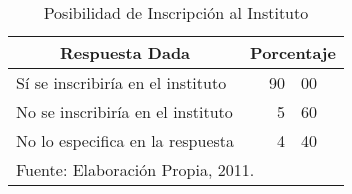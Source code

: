 \begin{table}[h!]
    \caption{Posibilidad de Inscripción al Instituto}
    \label{tbl:Encuesta:Aceptacion}
    \centering
    \begin{tabular}{l|r@{.}l@{\%}}
	    \multicolumn{1}{c|}{Respuesta Dada} &
	    	\multicolumn{2}{c}{Porcentaje} \\
	    \hline
	    \hline
	    Sí se inscribiría en el instituto & 90 & 00 \\
	    No se inscribiría en el instituto &  5 & 60 \\
	    No lo especifica en la respuesta   &  4 & 40 \\
	    \hline
	    \multicolumn{3}{l}{\footnotesize Fuente: Elaboración Propia, 2011.}
    \end{tabular}
\end{table}
